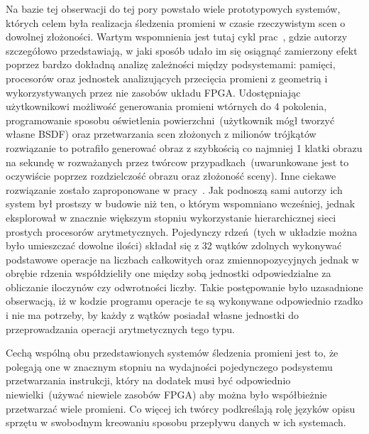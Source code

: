 Na bazie tej obserwacji do tej pory powstało wiele prototypowych systemów, których celem była realizacja śledzenia promieni w czasie rzeczywistym scen o dowolnej złożoności. Wartym wspomnienia jest tutaj cykl prac~\cite{Realtime_FPGA}\cite{RPU}\cite{Realtime_ASIC}, gdzie autorzy szczegółowo przedstawiają, w jaki sposób udało im się osiągnąć zamierzony efekt poprzez bardzo dokładną analizę zależności między podsystemami: pamięci, procesorów oraz jednostek analizujących przecięcia promieni z geometrią i wykorzystywanych przez nie zasobów układu FPGA. Udostępniając użytkownikowi możliwość generowania promieni wtórnych do 4 pokolenia, programowanie sposobu oświetlenia powierzchni~(użytkownik mógł tworzyć własne BSDF) oraz przetwarzania scen złożonych z milionów trójkątów rozwiązanie to potrafiło generować obraz z szybkością co najmniej 1 klatki obrazu na sekundę w rozważanych przez twórcow przypadkach~(uwarunkowane jest to oczywiście poprzez rozdzielczość obrazu oraz złożoność sceny). Inne ciekawe rozwiązanie zostało zaproponowane w pracy~\cite{TRAX}. Jak podnoszą sami autorzy ich system był prostszy w budowie niż ten, o którym wspomniano wcześniej, jednak eksplorował w znacznie większym stopniu wykorzystanie hierarchicznej sieci prostych procesorów arytmetycznych. Pojedynczy rdzeń~(tych w układzie można było umieszczać dowolne ilości) składał się z 32 wątków zdolnych wykonywać podstawowe operacje na liczbach całkowitych oraz zmiennopozycyjnych jednak w obrębie rdzenia współdzieliły one między sobą jednostki odpowiedzialne za obliczanie iloczynów czy odwrotności liczby. Takie postępowanie było uzasadnione obserwacją, iż w kodzie programu operacje te są wykonywane odpowiednio rzadko i nie ma potrzeby, by każdy z wątków posiadał własne jednostki do przeprowadzania operacji arytmetycznych tego typu.

Cechą wspólną obu przedstawionych systemów śledzenia promieni jest to, że polegają one w znacznym stopniu na wydajności pojedynczego podsystemu przetwarzania instrukcji, który na dodatek musi być odpowiednio niewielki~(używać niewiele zasobów FPGA) aby można było współbieżnie przetwarzać wiele promieni. Co więcej ich twórcy podkreślają rolę języków opisu sprzętu w swobodnym kreowaniu sposobu przepływu danych w ich systemach.

